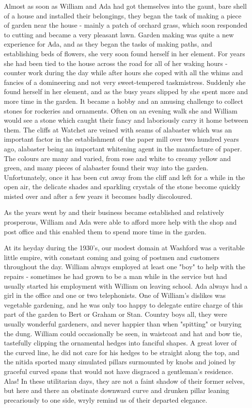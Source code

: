 
Almost as soon as William and Ada had got themselves into the gaunt, bare shell of a house and installed their belongings, they began the task of making a piece of garden near the house - mainly a patch of orchard grass, which soon responded to cutting and became a very pleasant lawn. Garden making was quite a new experience for Ada, and as they began the tasks of making paths, and establishing beds of flowers, she very soon found herself in her element. For years she had been tied to the house across the road for all of her waking hours - counter work during the day while after hours she coped with all the whims and fancies of a domineering and not very sweet-tempered taskmistress. Suddenly she found herself in her element, and as the busy years slipped by she spent more and more time in the garden. It became a hobby and an amusing challenge to collect stones for rockeries and ornaments. Often on an evening walk she and William would see a stone which caught their fancy and laboriously carry it home between them. The cliffs at Watchet are veined with seams of alabaster which was an important factor in the establishment of the paper mill over two hundred years ago, alabaster being an important whitening agent in the manufacture of paper. The colours are many and varied, from rose and white to creamy yellow and green, and many pieces of alabaster found their way into the garden. Unfortunately, once it has been cut away from the cliff and left for a while in the open air, the delicate shades and sparkling crystals of the stone become quickly misted over and after a few years it becomes badly discoloured.

As the years went by and their business became established and relatively prosperous, William and Ada were able to afford more help with the shop and post office and this enabled them to spend more time in the garden.

At its heyday during the 1930's, our modest domain at Washford was a veritable little empire, with constant coming and going of postmen and customers throughout the day. William always employed at least one "boy" to help with the repairs - sometimes he had grown to be a man while in the service but had usually started his employment with William on leaving school. Ada always had a girl in the office and one or two telephonists. One of William's dislikes was vegetable gardening, and he was only too happy to delegate entire charge of this part of the garden to Bert or Graham or Stan. Country boys all, they were usually wonderful gardeners, and never happier than when "spitting" or burying the dung. William could occasionally be seen, in waistcoat and hat and bow tie, tastefully clipping the ornamental hedges into fanciful shapes. A great lover of the curved line, he did not care for his hedges to be straight along the top, and the nitida sported many simulated pillars surmounted by knobs and joined by graceful curved spans that would not have disgraced a gentleman's residence. Alas! In these utilitarian days, they are not a faint shadow of their former selves, but here and there an obstinate downward curve and drunken pillar leaning precariously to one side, wryly remind us of their departed elegance.

